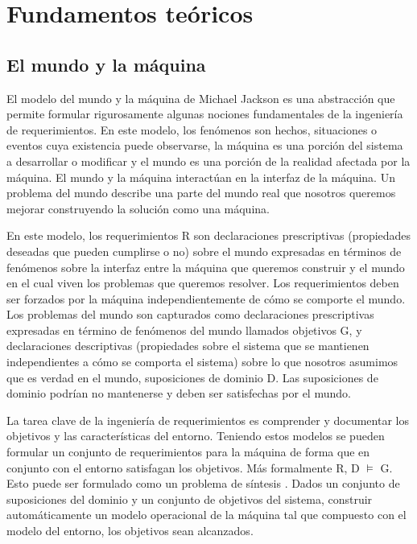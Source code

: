 \chapter{Fundamentos teóricos}

\section{El mundo y la máquina}
El modelo del mundo y la máquina de Michael Jackson \cite{MundoMaquina} es una abstracción que permite formular rigurosamente 
algunas nociones fundamentales de la ingeniería de requerimientos. En este modelo, los fenómenos son hechos, situaciones o 
eventos cuya existencia puede observarse, la máquina es una porción del sistema a desarrollar o modificar y el mundo es una 
porción de la realidad afectada por la máquina. El mundo y la máquina interactúan en la interfaz de la máquina. Un problema 
del mundo describe una parte del mundo real que nosotros queremos mejorar construyendo la solución como una máquina.


En este modelo, los requerimientos R son declaraciones prescriptivas (propiedades deseadas que pueden cumplirse o no) sobre 
el mundo expresadas en términos de fenómenos sobre la interfaz entre la máquina que queremos construir y el mundo en el cual 
viven los problemas que queremos resolver. Los requerimientos deben ser forzados por la máquina independientemente de cómo 
se comporte el mundo. Los problemas del mundo son capturados como declaraciones prescriptivas expresadas en término de 
fenómenos del mundo llamados objetivos G, y declaraciones descriptivas (propiedades sobre el sistema que se mantienen 
independientes a cómo se comporta el sistema) sobre lo que nosotros asumimos que es verdad en el mundo, suposiciones 
de dominio D. Las suposiciones de dominio podrían no mantenerse y deben ser satisfechas por el mundo.


La tarea clave de la ingeniería de requerimientos es comprender y documentar los objetivos y las características del entorno. 
Teniendo estos modelos se pueden formular un conjunto de requerimientos para la máquina de forma que en conjunto con el 
entorno satisfagan los objetivos. Más formalmente R, D $\vDash$ G. 
Esto puede ser formulado como un problema de síntesis \cite{Sintesis}. Dados un conjunto de suposiciones del dominio y un conjunto de 
objetivos del sistema, construir  automáticamente un modelo operacional de la máquina tal que compuesto con el modelo del 
entorno, los objetivos sean alcanzados.


